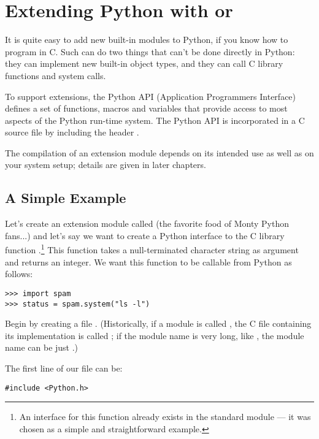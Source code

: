\chapter{Extending Python with \C{} or \Cpp{} \label{intro}}


It is quite easy to add new built-in modules to Python, if you know
how to program in C.  Such  can do two things
that can't be done directly in Python: they can implement new built-in
object types, and they can call C library functions and system calls.

To support extensions, the Python API (Application Programmers
Interface) defines a set of functions, macros and variables that
provide access to most aspects of the Python run-time system.  The
Python API is incorporated in a C source file by including the header
.

The compilation of an extension module depends on its intended use as
well as on your system setup; details are given in later chapters.


\section{A Simple Example
         \label{simpleExample}}

Let's create an extension module called  (the favorite food
of Monty Python fans...) and let's say we want to create a Python
interface to the C library function .\footnote{An
interface for this function already exists in the standard module
 --- it was chosen as a simple and straightforward example.}
This function takes a null-terminated character string as argument and
returns an integer.  We want this function to be callable from Python
as follows:

\begin{verbatim}
>>> import spam
>>> status = spam.system("ls -l")
\end{verbatim}

Begin by creating a file .  (Historically, if a
module is called , the C file containing its implementation
is called ; if the module name is very long, like
, the module name can be just .)

The first line of our file can be:

\begin{verbatim}
#include <Python.h>
\end{verbatim}

